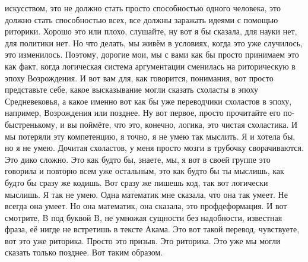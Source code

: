 искусством, это не должно стать просто способностью одного человека, это должно
стать способностью всех, все должны заражать идеями с помощью риторики. Хорошо
это или плохо, слушайте, ну вот я бы сказала, для науки нет, для политики нет.
Но что делать, мы живём в условиях, когда это уже случилось, это изменилось.
Поэтому, дорогие мои, мы с вами как бы просто принимаем это как факт, когда
логическая система аргументации сменилась на риторическую в эпоху Возрождения. И
вот вам для, как говорится, понимания, вот просто представьте себе, какое
высказывание могли сказать схоласты в эпоху Средневековья, а какое именно вот
как бы уже переводчики схоластов в эпоху, например, Возрождения или позднее. Ну
вот первое, просто прочитайте его по-быстренькому, и вы поймёте, что это,
конечно, логика, это чистая схоластика. И мы потеряли эту компетенцию, я точно,
я не умею так мыслить. Я и хотела бы, но я не умею. Дочитая схоластов, у меня
просто мозги в трубочку сворачиваются. Это дико сложно. Это как будто бы,
знаете, мы, я вот в своей группе это говорила и повторю всем уже остальным, это
как будто бы ты мыслишь, как будто бы сразу же кодишь. Вот сразу же пишешь код,
так вот логически мыслишь. Я так не умею. Одна математик мне сказала, что она
так умеет. Не всегда она умеет. Но она математик, она сказала, это
профдеформация. И вот смотрите, B под буквой B, не умножая сущности без
надобности, известная фраза, её нигде не встретишь в тексте Акама. Это вот такой
перевод, чувствуете, вот это уже риторика. Просто это призыв. Это риторика. Это
уже мы могли сказать только позднее. Вот таким образом. 


